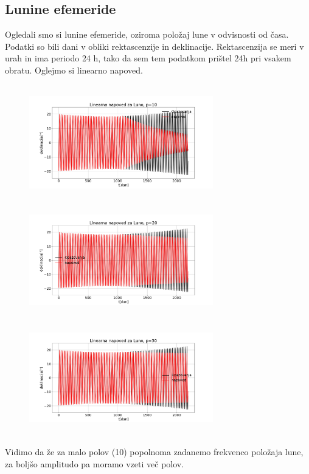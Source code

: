 \documentclass[11pt, a4paper]{article}
\begin{document}
\subsection{Lunine efemeride}
Ogledali smo si lunine efemeride, oziroma položaj lune v odvisnosti od časa. Podatki so bili dani v obliki rektascenzije in deklinacije. Rektascenzija se meri v urah in ima periodo 24 h, tako da sem tem podatkom prištel 24h pri vsakem obratu. Oglejmo
si linearno napoved.
\begin{figure}[H]
\centering
  \includegraphics[width=8cm,height=5cm]{1.png}
  \includegraphics[width=8cm,height=5cm]{3.png}
  \includegraphics[width=8cm,height=5cm]{2.png}

\end{figure}
Vidimo da že za malo polov (10) popolnoma zadanemo frekvenco položaja lune, za boljšo amplitudo pa moramo vzeti več polov.
\end{document}
